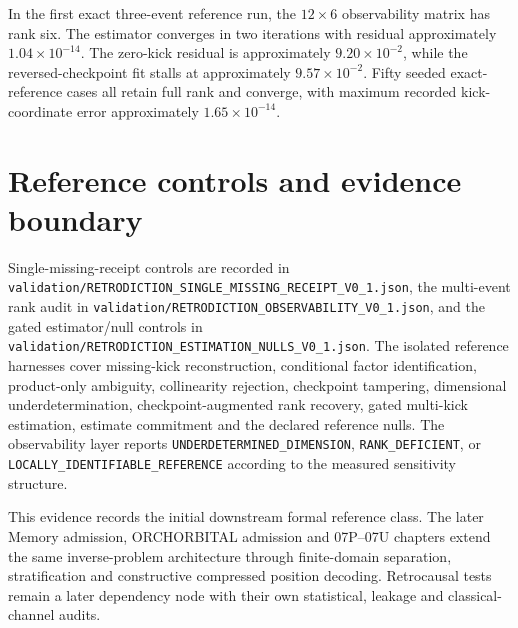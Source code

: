 In the first exact three-event reference run, the \(12\times6\) observability matrix has rank six. The estimator converges in two iterations with residual approximately \(1.04\times10^{-14}\). The zero-kick residual is approximately \(9.20\times10^{-2}\), while the reversed-checkpoint fit stalls at approximately \(9.57\times10^{-2}\). Fifty seeded exact-reference cases all retain full rank and converge, with maximum recorded kick-coordinate error approximately \(1.65\times10^{-14}\).

\section{Reference controls and evidence boundary}

Single-missing-receipt controls are recorded in
\texttt{validation/RETRODICTION\_SINGLE\_MISSING\_RECEIPT\_V0\_1.json},
the multi-event rank audit in
\texttt{validation/RETRODICTION\_OBSERVABILITY\_V0\_1.json},
and the gated estimator/null controls in
\texttt{validation/RETRODICTION\_ESTIMATION\_NULLS\_V0\_1.json}.
The isolated reference harnesses cover missing-kick reconstruction, conditional factor identification, product-only ambiguity, collinearity rejection, checkpoint tampering, dimensional underdetermination, checkpoint-augmented rank recovery, gated multi-kick estimation, estimate commitment and the declared reference nulls. The observability layer reports \texttt{UNDERDETERMINED\_DIMENSION}, \texttt{RANK\_DEFICIENT}, or \texttt{LOCALLY\_IDENTIFIABLE\_REFERENCE} according to the measured sensitivity structure.

This evidence records the initial downstream formal reference class. The later Memory admission, ORCHORBITAL admission and 07P--07U chapters extend the same inverse-problem architecture through finite-domain separation, stratification and constructive compressed position decoding. Retrocausal tests remain a later dependency node with their own statistical, leakage and classical-channel audits.
